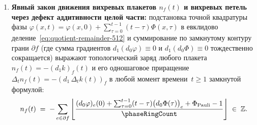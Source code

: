 \begin{corollary}[Единство природы и количества заряда: частное и остаток одного деления на $\phaseRingCount = 512$]
\begin{enumerate}[label=(\roman*)]
  Суммарно на такте $t=2$ этот двухшаговый переброс частного $\Delta_t k_{xy}=\pm 1$ через противофазный порог $256$ тиков на границе трёхгранного угла~$K_3$
  рождает из этого безвихревого состояния в плоскости~$xy$ ровно $2N_\varphi = 2(1+|N_{12}|) = 26$ вихревых плакетов ($13$ дипольных пар $n_f = \pm 1$), в плоскости~$yz$ --- также ровно $2N_\varphi = 26$ вихревых плакетов, а в плоскости~$xz$ (содержащей ось рампы океана~$x_1$ и разрез~$z$) --- ровно $2N_\varphi + |\triangle| = 26 + 8 = 34$ вихревых плакета:
  \begin{equation}
  \label{eq:t2-26-vortex-plaquettes}
  \begin{aligned}
    \sum_{f\in\square_{xy}}|n_f(2)| &= \sum_{f\in\square_{yz}}|n_f(2)| = 2N_\varphi = 26,\qquad
    \sum_{f\in\square_{xz}}|n_f(2)| = 2N_\varphi + |\triangle| = 34,\\
    \sum_{f\in\square_{\mathrm{all}}}|n_f(2)| &= 6N_\varphi + |\triangle| = 86.
  \end{aligned}
  \end{equation}
  По дискретному закону Гаусса~\eqref{eq:discrete-gauss-b} ($d_2 B \equiv 0$, $\sum_{f\in\partial\mathrm{cube}} n_f \equiv 0$ в каждом элементарном кубе решётки) эти $86$ плакетов не имеют свободных концов и образуют ровно $10$ замкнутых вихревых колец, пронизывающих $85$ элементарных кубов ($84$ куба степени~$2$ и $1$ четырёхкратный узел сцепления степени~$4$ в точке $(-1,-4,-4)$).
\item \textbf{Явный закон движения вихревых плакетов $n_f(t)$ и вихревых петель через дефект аддитивности целой части:}
  подстановка точной квадратуры фазы $\varphi(x,t) = \varphi(x,0) + \sum_{\tau=0}^{t-1}(t-\tau)\Phi(x,\tau)$ в евклидово деление~\eqref{eq:quotient-remainder-512}
  и суммирование по замкнутому контуру грани $\partial f$ (где сумма градиентов $d_1(d_0\varphi)\equiv 0$ и $d_1(d_0\Phi)\equiv 0$ тождественно сокращается)
  выражают топологический заряд любого плакета $n_f(t) = -(d_1 k)_f(t)$ и его одношаговое приращение $\Delta_t n_f(t) = -(d_1\,\Delta_t k(t))_f$ в любой момент времени~$t\ge 1$ замкнутой формулой:
  \begin{equation}
  \label{eq:explicit-plaquette-law-of-motion}
    n_f(t)
    \;=\;
    -\sum_{e\in\partial f}
    \left\lfloor
      \frac{(d_0\varphi)_e(0) + \sum_{\tau=0}^{t-1}(t-\tau)\bigl(d_0\Phi(\tau)\bigr)_e + \Phi_{\mathrm{Pauli}} - 1}{\phaseRingCount}
    \right\rfloor
    \;\in\; \mathbb{Z}.
  \end{equation}

\end{enumerate}
\end{corollary}
